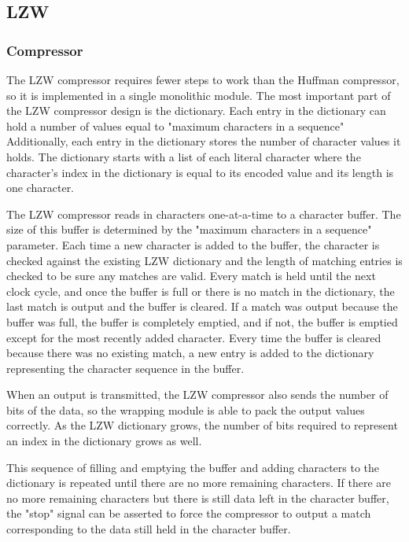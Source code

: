 \documentclass[doublespace,nopageskip]{VTthesis}
\begin{document}
\subsection{LZW}\label{ss:lzw}
\subsubsection{Compressor}\label{sss:compressor}
The LZW compressor requires fewer steps to work than the Huffman compressor, so it is implemented in a single monolithic module. The most important part of the LZW compressor design is the dictionary. Each entry in the dictionary can hold a number of values equal to "maximum characters in a sequence" Additionally, each entry in the dictionary stores the number of character values it holds. The dictionary starts with a list of each literal character where the character's index in the dictionary is equal to its encoded value and its length is one character.

The LZW compressor reads in characters one-at-a-time to a character buffer. The size of this buffer is determined by the "maximum characters in a sequence" parameter. Each time a new character is added to the buffer, the character is checked against the existing LZW dictionary and the length of matching entries is checked to be sure any matches are valid. Every match is held until the next clock cycle, and once the buffer is full or there is no match in the dictionary, the last match is output and the buffer is cleared. If a match was output because the buffer was full, the buffer is completely emptied, and if not, the buffer is emptied except for the most recently added character. Every time the buffer is cleared because there was no existing match, a new entry is added to the dictionary representing the character sequence in the buffer.

When an output is transmitted, the LZW compressor also sends the number of bits of the data, so the wrapping module is able to pack the output values correctly. As the LZW dictionary grows, the number of bits required to represent an index in the dictionary grows as well.

This sequence of filling and emptying the buffer and adding characters to the dictionary is repeated until there are no more remaining characters. If there are no more remaining characters but there is still data left in the character buffer, the "stop" signal can be asserted to force the compressor to output a match corresponding to the data still held in the character buffer.
\end{document}
